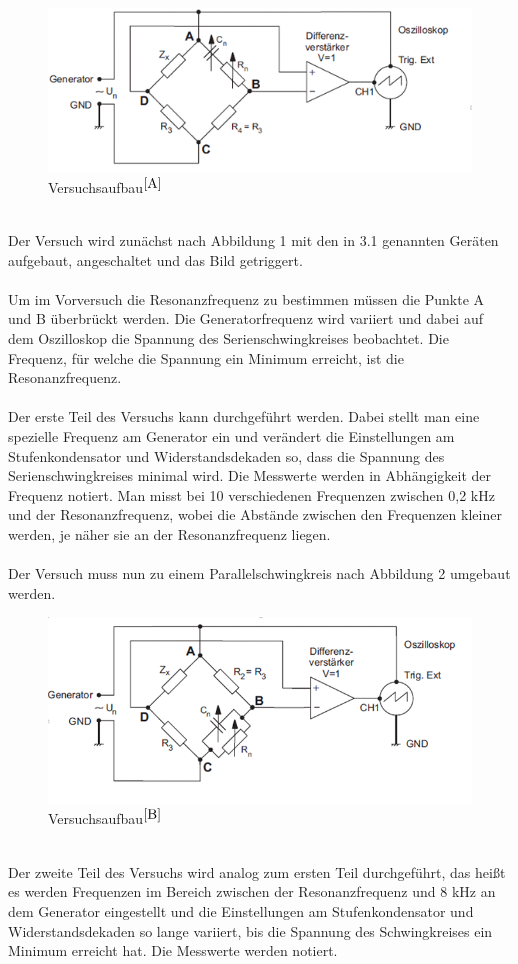 \documentclass[fontsize=12pt]{scrartcl}
\begin{document}
\begin{figure}[h]
\includegraphics[scale=0.7]{Graphik/Versuchsaufbau}
\caption{Versuchsaufbau$^{\cite{A}}$}
\end{figure}
~\\
Der Versuch wird zunächst nach Abbildung 1 mit den in 3.1 genannten Geräten aufgebaut, angeschaltet und das Bild getriggert. \\
~\\
Um im Vorversuch die Resonanzfrequenz zu bestimmen müssen die Punkte A und B überbrückt werden. Die Generatorfrequenz wird variiert und dabei auf dem Oszilloskop die Spannung des Serienschwingkreises beobachtet. Die Frequenz, für welche die Spannung ein Minimum erreicht, ist die Resonanzfrequenz. \\
~\\
Der erste Teil des Versuchs kann durchgeführt werden. Dabei stellt man eine spezielle Frequenz am Generator ein und verändert die Einstellungen am Stufenkondensator und Widerstandsdekaden so, dass die Spannung des Serienschwingkreises minimal wird. Die Messwerte werden in Abhängigkeit der Frequenz notiert. Man misst bei 10 verschiedenen Frequenzen zwischen 0,2 kHz und der Resonanzfrequenz, wobei die Abstände zwischen den Frequenzen kleiner werden, je näher sie an der Resonanzfrequenz liegen. \\
~\\
Der Versuch muss nun zu einem Parallelschwingkreis nach Abbildung 2 umgebaut werden. \\

\begin{figure}[h]
\includegraphics[scale=0.7]{Graphik/Versuchsaufbau2}
\caption{Versuchsaufbau$^{\cite{B}}$}
\end{figure}
~\\
Der zweite Teil des Versuchs wird analog zum ersten Teil durchgeführt, das heißt es werden Frequenzen im Bereich zwischen der Resonanzfrequenz und 8 kHz an dem Generator eingestellt und die Einstellungen am Stufenkondensator und Widerstandsdekaden so lange variiert, bis die Spannung des Schwingkreises ein Minimum erreicht hat. Die Messwerte werden notiert.
\newpage
\end{document}
